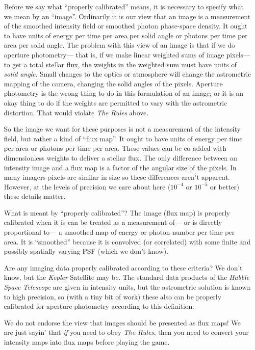\documentclass[12pt, letterpaper, preprint]{aastex}
\newcommand{\project}[1]{\textsl{#1}}
\begin{document}
Before we say what ``properly calibrated'' means,
  it is necessary to specify what we mean by an ``image''.
Ordinarily it is our view that
  an image is a measurement of the smoothed intensity field
  or smoothed photon phase-space density.
It ought to have units of energy per time per area per solid angle
  or photons per time per area per solid angle.
The problem with this view of an image
  is that if we do aperture photometry---%
  that is, if we make linear weighted sums of image pixels---%
  to get a total stellar flux,
  the weights in the weighted sum must have units of \emph{solid angle}.
Small changes to the optics or atmosphere will change the astrometric mapping of the camera,
  changing the solid angles of the pixels.
Aperture photometry is the wrong thing to do in this formulation of an image;
  or it is an okay thing to do if the weights are permitted to vary with the astrometric distortion.
That would violate \emph{The Rules} above.

So the image we want for these purposes is not a measurement of the intensity field,
  but rather a kind of ``flux map''.
It ought to have units of energy per time per area
  or photons per time per area.
These values can be co-added with dimensionless weights to deliver a stellar flux.
The only difference between an intensity image and a flux map is a factor of
  the angular size of the pixels.
In many imagers pixels are similar in size so these differences aren't apparent.
However, at the levels of precision we care about here
  ($10^{-4}$ or $10^{-5}$ or better)
  these details matter.

What is meant by ``properly calibrated''?
The image (flux map) is properly calibrated when it is can be treated as a measurement of---%
  or is directly proportional to---%
  a smoothed map of energy or photon number per time per area.
It is ``smoothed'' because it is convolved (or correlated) with some finite
  and possibly spatially varying PSF
  (which we don't know).

Are any imaging data properly calibrated according to these criteria?
We don't know, but the \project{Kepler} Satellite may be.
The standard data products of the \project{Hubble Space Telescope}
  are given in intensity units,
  but the astrometric solution is known to high precision,
  so (with a tiny bit of work)
  these also can be properly calibrated for aperture photometry according to this definition.

We do not endorse the view that images should be presented as flux maps!
We are just sayin' that \emph{if} you need to obey \emph{The Rules},
  then you need to convert your intensity maps into flux maps before playing the game.
\end{document}
